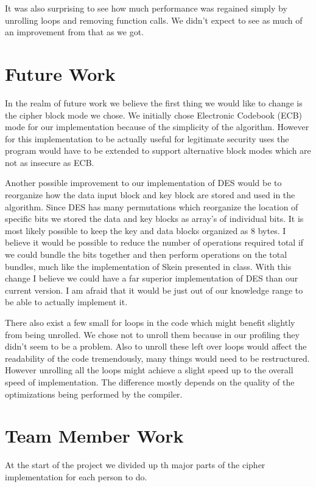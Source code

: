 \documentclass[10pt]{article}
\begin{document}
It was also surprising to see how much performance was regained simply by unrolling loops and removing function calls. We didn't expect to see as much of an improvement from that as we got.
\section{Future Work}

  In the realm of future work we believe the first thing we would like to change is the cipher block mode we chose.
  We initially chose Electronic Codebook (ECB) mode for our implementation because of the simplicity of the algorithm.
  However for this implementation to be actually useful for legitimate security uses the program would have to be extended
  to support alternative block modes which are not as insecure as ECB.

  Another possible improvement to our implementation of DES would be to reorganize how the data input block and key block
  are stored and used in the algorithm. Since DES has many permutations which reorganize the location of specific bits we 
  stored the data and key blocks as array's of individual bits. It is most likely possible to keep the key and data blocks
  organized as 8 bytes. I believe it would be possible to reduce the number of operations required total if we could bundle the 
  bits together and then perform operations on the total bundles, much like the implementation of Skein presented in class. 
  With this change I believe we could have a far superior implementation of DES than our current version. I am afraid that it
  would be just out of our knowledge range to be able to actually implement it. 

  There also exist a few small for loops in the code which might benefit slightly from being unrolled.
  We chose not to unroll them because in our profiling they didn't seem to be a problem. Also to unroll
  these left over loops would affect the readability of the code tremendously, many things would need to be 
  restructured. However unrolling all the loops might achieve a slight speed up to the overall speed of implementation.
  The difference mostly depends on the quality of the optimizations being performed by the compiler.

\section{Team Member Work}

  At the start of the project we divided up th major parts of the cipher implementation for each person to do. \\
\end{document}
